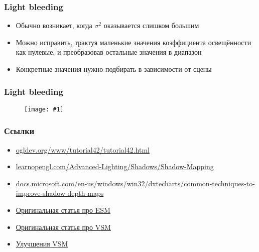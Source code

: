 \documentclass{beamer}
\newcommand{\slideimage}[1]{
  \begin{figure}
    \begin{adjustbox}{width=\textwidth, totalheight=\textheight-2\baselineskip-2\baselineskip,keepaspectratio}
      \texttt{[image: \#1]}
    \end{adjustbox}
  \end{figure}
}
\begin{document}
\begin{frame}[fragile]
\frametitle{Light bleeding}
\begin{itemize}
\item Обычно возникает, когда \begin{math}\sigma^2\end{math} оказывается слишком большим
\pause
\item Можно исправить, трактуя маленькие значения коэффициента освещённости как нулевые, и преобразовав остальные значения в диапазон \begin{math}[0, 1]\end{math}
\pause
\item Конкретные значения нужно подбирать в зависимости от сцены
\end{itemize}
\end{frame}

\begin{frame}[fragile]
\frametitle{Light bleeding}
\slideimage{light_bleeding_scheme.jpg}
\end{frame}

\begin{frame}[fragile]
\frametitle{Ссылки}
\begin{itemize}
\item \href{https://ogldev.org/www/tutorial42/tutorial42.html}{ogldev.org/www/tutorial42/tutorial42.html}
\item \href{https://learnopengl.com/Advanced-Lighting/Shadows/Shadow-Mapping}{learnopengl.com/Advanced-Lighting/Shadows/Shadow-Mapping}
\item \href{https://docs.microsoft.com/en-us/windows/win32/dxtecharts/common-techniques-to-improve-shadow-depth-maps}{docs.microsoft.com/en-us/windows/win32/dxtecharts/common-techniques-to-improve-shadow-depth-maps}
\item \href{https://jankautz.com/publications/esm_gi08.pdf}{Оригинальная статья про ESM}
\item \href{https://www.intel.com/content/dam/develop/external/us/en/documents/vsm-paper-182631.pdf}{Оригинальная статья про VSM}
\item \href{https://developer.nvidia.com/gpugems/gpugems3/part-ii-light-and-shadows/chapter-8-summed-area-variance-shadow-maps}{Улучшения VSM}
\end{itemize}
\end{frame}
\end{document}
